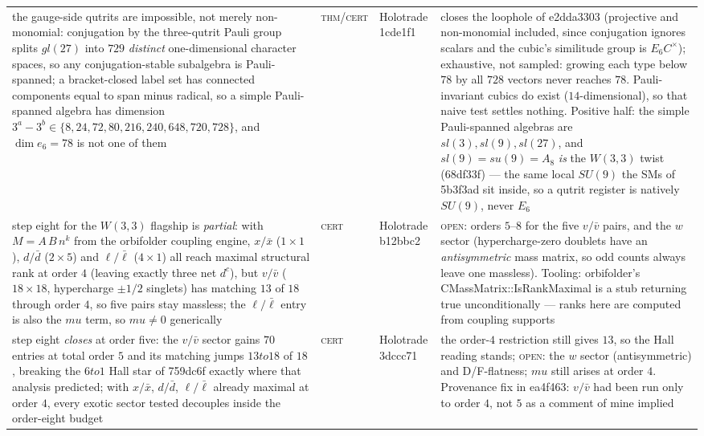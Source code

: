 \documentclass[12pt,a4paper]{article}
\def\mathbb#1{#1}%
\def\mathfrak#1{#1}%
\def\textbf#1{#1}%
\def\texttt#1{#1}%
\def\mu{mu}%
\def\cdot{ }%
\def\to{ to }%
\theoremstyle{definition}
\newcommand{\CC}{\mathbb{C}}
\begin{document}
\begin{center}
\begin{tabular}{@{}p{}llp{}@{}}
\textbf{the gauge-side qutrits are impossible, not merely non-monomial}: conjugation by the three-qutrit Pauli group splits $\mathfrak{gl}(27)$ into $729$ \emph{distinct} one-dimensional character spaces, so any conjugation-stable subalgebra is Pauli-spanned; a bracket-closed label set has connected components equal to span minus radical, so a simple Pauli-spanned algebra has dimension $3^a-3^b\in\{8,24,72,80,216,240,648,720,728\}$, and $\dim\mathfrak{e}_6=78$ is not one of them & \textsc{thm}/\textsc{cert} & Holotrade \texttt{1cde1f1} & closes the loophole of \texttt{e2dda3303} (projective and non-monomial included, since conjugation ignores scalars and the cubic's similitude group is $E_6\cdot\CC^\times$); exhaustive, not sampled: growing each type below $78$ by all $728$ vectors never reaches $78$. Pauli-invariant cubics do exist ($14$-dimensional), so that naive test settles nothing. Positive half: the simple Pauli-spanned algebras are $\mathfrak{sl}(3),\mathfrak{sl}(9),\mathfrak{sl}(27)$, and $\mathfrak{sl}(9)=\mathfrak{su}(9)=A_8$ \emph{is} the $W(3,3)$ twist (\texttt{68df33f}) --- the same local $SU(9)$ the SMs of \texttt{5b3f3ad} sit inside, so a qutrit register is natively $SU(9)$, never $E_6$ \\
step eight for the $W(3,3)$ flagship is \emph{partial}: with $M=A\,B\,n^k$ from the orbifolder coupling engine, $x/\bar x$ ($1{\times}1$), $d/\bar d$ ($2{\times}5$) and $\ell/\bar\ell$ ($4{\times}1$) all reach maximal structural rank at order $4$ (leaving exactly three net $d^c$), but $v/\bar v$ ($18{\times}18$, hypercharge $\pm 1/2$ singlets) has matching $13$ of $18$ through order $4$, so five pairs stay massless; the $\ell/\bar\ell$ entry is also the $\mu$ term, so $\mu\neq 0$ generically & \textsc{cert} & Holotrade \texttt{b12bbc2} & \textsc{open}: orders $5$--$8$ for the five $v/\bar v$ pairs, and the $w$ sector (hypercharge-zero doublets have an \emph{antisymmetric} mass matrix, so odd counts always leave one massless). Tooling: orbifolder's \texttt{CMassMatrix::IsRankMaximal} is a stub returning \texttt{true} unconditionally --- ranks here are computed from coupling supports \\
step eight \emph{closes} at order five: the $v/\bar v$ sector gains $70$ entries at total order $5$ and its matching jumps $13\to 18$ of $18$, breaking the $6\to 1$ Hall star of \texttt{759dc6f} exactly where that analysis predicted; with $x/\bar x$, $d/\bar d$, $\ell/\bar\ell$ already maximal at order $4$, every exotic sector tested decouples inside the order-eight budget & \textsc{cert} & Holotrade \texttt{3dccc71} & the order-$4$ restriction still gives $13$, so the Hall reading stands; \textsc{open}: the $w$ sector (antisymmetric) and D/F-flatness; $\mu$ still arises at order $4$. Provenance fix in \texttt{ea4f463}: $v/\bar v$ had been run only to order $4$, not $5$ as a comment of mine implied \\

\end{tabular}
\end{center}
\end{document}
